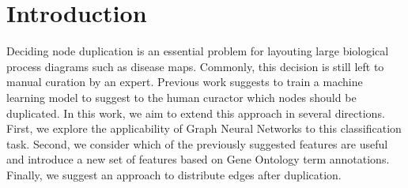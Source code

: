 \documentclass[
	fontsize=10pt, %
	twoside=false, %
	secnumdepth=1, %
  toc=indentunnumbered %
]{kaobook}
\begin{document}



\chapter{Introduction}








Deciding node duplication is an essential problem for
layouting large biological process diagrams such as disease maps. 
Commonly, this decision is still left to manual curation by an expert. Previous
work
\cite{nielsen_MachineLearningSupport_2019}
suggests to train a machine learning model to suggest to the human curactor
which nodes should be duplicated. In this work, we aim to extend this
approach in several directions. First, we explore the applicability of Graph
Neural Networks to this classification task. Second, we consider which of the
previously suggested features are useful and introduce a new set of features
based on Gene Ontology term annotations. Finally, we suggest an approach to
distribute edges after duplication.
\end{document}
